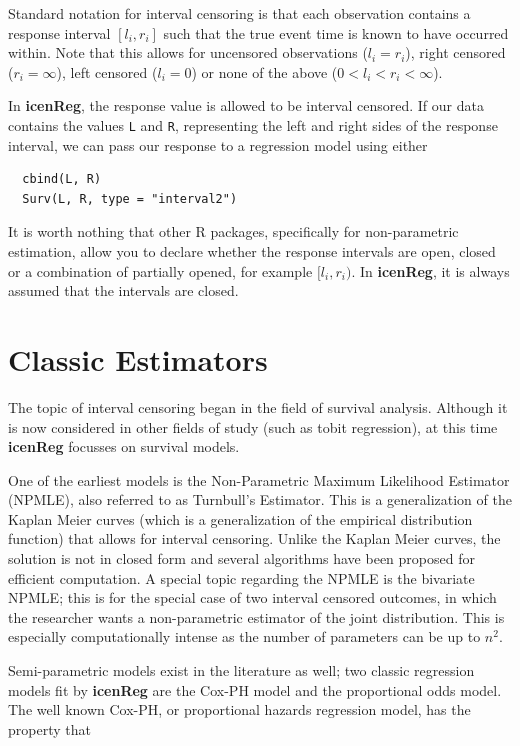 \documentclass[11pt]{report}
\begin{document}
  Standard notation for interval censoring is that each observation contains a response
  interval $[l_i,r_i]$ such that the true event time is known to have occurred within. Note
  that this allows for uncensored observations ($l_i = r_i$), right censored 
  ($r_i = \infty$), left censored ($l_i = 0$) or none of the above 
  ($0 < l_i < r_i < \infty$). 
  
  In {\bf icenReg}, the response value is allowed to be interval censored. If our 
  data contains the values \texttt{L} and \texttt{R}, representing the left and 
  right sides of the response interval, we can pass our response to a regression model
  using either
  
  \begin{verbatim}
  cbind(L, R)
  Surv(L, R, type = "interval2")
  \end{verbatim}
  
  It is worth nothing that other R packages, specifically for non-parametric estimation, 
  allow you to declare whether the response intervals are open, closed or a combination
  of partially opened, for example $[l_i, r_i)$. In {\bf icenReg}, it is always assumed 
  that the intervals are closed. 
  
  \section{Classic Estimators}
  
  The topic of interval censoring began in the field of survival analysis. 
  Although it is now considered in other fields of study (such as tobit regression),
  at this time {\bf{icenReg}} focusses on survival models. 
  
  
  One of the earliest models is the Non-Parametric Maximum Likelihood Estimator 
  (NPMLE), also referred to as Turnbull's Estimator. This is a generalization of
  the Kaplan Meier curves (which is a generalization of the empirical distribution function)
  that allows for interval censoring. Unlike the Kaplan Meier curves, the solution is not
  in closed form and several algorithms have been proposed for efficient computation. 
  A special topic regarding the NPMLE is the bivariate NPMLE; this is for the special 
  case of two interval censored outcomes, in which the researcher wants a non-parametric 
  estimator of the joint distribution. This is especially computationally intense as the
  number of parameters can be up to $n^2$. 
  
  Semi-parametric models exist in the literature as well; two classic regression models
  fit by {\bf icenReg} are the Cox-PH model and the proportional odds model. 
  The well known Cox-PH, or proportional hazards regression model, has the property that
  
\end{document}
